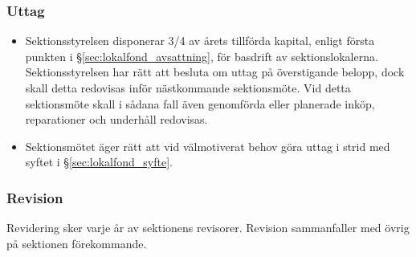 \documentclass[a4paper, 10pt]{article}
\begin{document}
\subsubsection{Uttag}
\begin{itemize}
\item Sektionsstyrelsen disponerar 3/4 av årets tillförda kapital,
enligt första punkten i §\ref{sec:lokalfond_avsattning}, för basdrift av sektionslokalerna. Sektionsstyrelsen har rätt att besluta om uttag på överstigande belopp, dock skall detta redovisas inför nästkommande sektionsmöte. Vid detta sektionsmöte skall i sådana fall även genomförda eller planerade inköp, reparationer och underhåll redovisas.
\item Sektionsmötet äger rätt att vid välmotiverat behov göra uttag i strid med syftet i §\ref{sec:lokalfond_syfte}.
\end{itemize}
\subsubsection{Revision}
Revidering sker varje år av sektionens revisorer. Revision
sammanfaller med övrig på sektionen förekommande.
\end{document}
